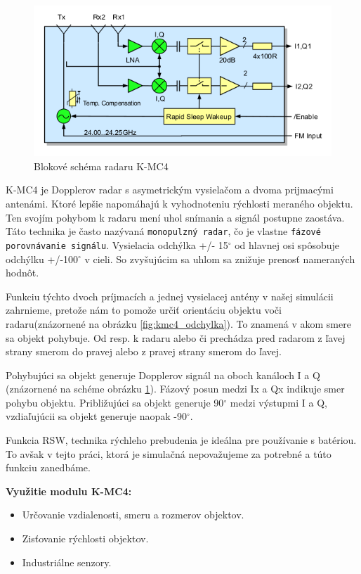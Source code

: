     \begin{figure}[h!]
        \centering
        \includegraphics[width=1.0\textwidth]{obrazky-figures/radar_kmc4.png}
        \caption{Blokové schéma radaru K-MC4 \cite{kmc4sheet}}
        \label{fig:radar_kmc4}
    \end{figure}

    K-MC4 je Dopplerov radar s asymetrickým vysielačom a dvoma prijmacými antenámi. Ktoré lepšie napomáhajú k vyhodnoteniu rýchlosti meraného objektu. Ten svojím pohybom k radaru mení uhol snímania a signál postupne zaostáva. Táto technika je často nazývaná \verb|monopulzný radar|, čo je vlastne \verb|fázové porovnávanie signálu|. Vysielacia odchýlka +/- 15$^{\circ}$ od hlavnej osi spôsobuje odchýlku +/-100$^{\circ}$ v cieli. So zvyšujúcim sa uhlom sa znižuje prenosť nameraných hodnôt.

    Funkciu týchto dvoch príjmacích a jednej vysielacej antény v našej simulácii zahrnieme, pretože nám to pomože určiť orientáciu objektu voči radaru(znázornené na obrázku \ref{fig:kmc4_odchylka}). To znamená v akom smere sa objekt pohybuje. Od resp. k radaru alebo či prechádza pred radarom z ľavej strany smerom do pravej alebo z pravej strany smerom do ľavej.   

    Pohybujúci sa objekt generuje Dopplerov signál na oboch kanáloch I a Q (znázornené na schéme obrázku \ref{fig:radar_kmc4}). Fázový posun medzi Ix a Qx indikuje smer pohybu objektu. Približujúci sa objekt generuje 90$^{\circ}$ medzi výstupmi I a Q, vzdiaľujúcii sa objekt generuje naopak -90$^{\circ}$.

    Funkcia RSW, technika rýchleho prebudenia je ideálna pre používanie s batériou\cite{kmc4sheet}. To avšak v tejto práci, ktorá je simulačná nepovažujeme za potrebné a túto funkciu zanedbáme.
    \newline

    \textbf{Využitie modulu K-MC4:}
    \begin{itemize}
      \item Určovanie vzdialenosti, smeru a rozmerov objektov.
      \item Zisťovanie rýchlosti objektov.
      \item Industriálne senzory.
    \end{itemize}


